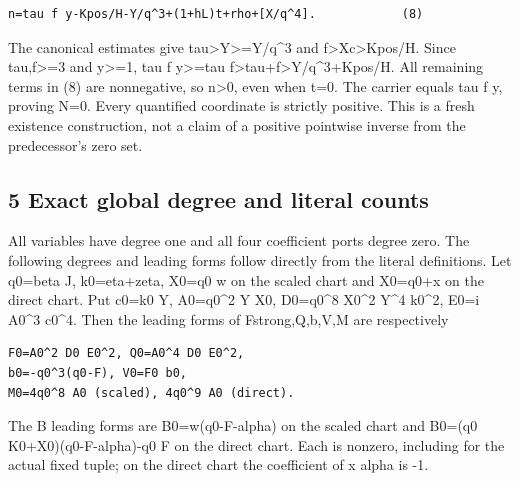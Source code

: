 \begin{verbatim}
n=tau f y-Kpos/H-Y/q^3+(1+hL)t+rho+[X/q^4].            (8)
\end{verbatim}

The canonical estimates give tau\textgreater{}\allowbreak{}Y\textgreater{}\allowbreak{}=\allowbreak{}Y/\allowbreak{}q\textasciicircum{}\allowbreak{}3 and f\textgreater{}\allowbreak{}Xc\textgreater{}\allowbreak{}Kpos/\allowbreak{}H. Since tau,f\textgreater{}\allowbreak{}=\allowbreak{}3 and y\textgreater{}\allowbreak{}=\allowbreak{}1, tau f y\textgreater{}\allowbreak{}=\allowbreak{}tau f\textgreater{}\allowbreak{}tau+\allowbreak{}f\textgreater{}\allowbreak{}Y/\allowbreak{}q\textasciicircum{}\allowbreak{}3+\allowbreak{}Kpos/\allowbreak{}H. All remaining terms in (8) are nonnegative, so n\textgreater{}\allowbreak{}0, even when t=\allowbreak{}0. The carrier equals tau f y, proving N=\allowbreak{}0. Every quantified coordinate is strictly positive. This is a fresh existence construction, not a claim of a positive pointwise inverse from the predecessor's zero set.



\subsection{5 Exact global degree and literal counts}



All variables have degree one and all four coefficient ports degree zero. The following degrees and leading forms follow directly from the literal definitions. Let q0=\allowbreak{}beta J, k0=\allowbreak{}eta+\allowbreak{}zeta, X0=\allowbreak{}q0 w on the scaled chart and X0=\allowbreak{}q0+\allowbreak{}x on the direct chart. Put c0=\allowbreak{}k0 Y, A0=\allowbreak{}q0\textasciicircum{}\allowbreak{}2 Y X0, D0=\allowbreak{}q0\textasciicircum{}\allowbreak{}8 X0\textasciicircum{}\allowbreak{}2 Y\textasciicircum{}\allowbreak{}4 k0\textasciicircum{}\allowbreak{}2, E0=\allowbreak{}i A0\textasciicircum{}\allowbreak{}3 c0\textasciicircum{}\allowbreak{}4. Then the leading forms of Fstrong,Q,b,V,M are respectively



\begin{verbatim}
F0=A0^2 D0 E0^2, Q0=A0^4 D0 E0^2,
b0=-q0^3(q0-F), V0=F0 b0,
M0=4q0^8 A0 (scaled), 4q0^9 A0 (direct).
\end{verbatim}

The B leading forms are B0=\allowbreak{}w(q0-F-alpha) on the scaled chart and B0=\allowbreak{}(q0 K0+\allowbreak{}X0)(q0-F-alpha)-q0 F on the direct chart. Each is nonzero, including for the actual fixed tuple; on the direct chart the coefficient of x alpha is -1.



